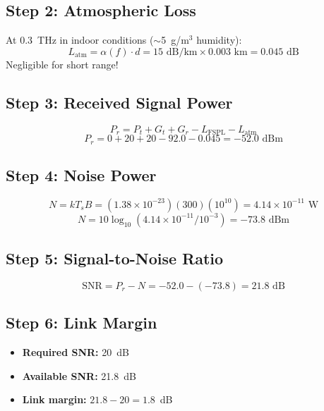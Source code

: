 \subsection*{Step 2: Atmospheric Loss}

At 0.3~THz in indoor conditions ($\sim$5~g/m$^3$ humidity):
\begin{equation}
L_{\text{atm}} = \alpha(f) \cdot d = 15 \text{ dB/km} \times 0.003 \text{ km} = 0.045 \text{ dB}
\end{equation}
Negligible for short range!

\subsection*{Step 3: Received Signal Power}

\begin{equation}
P_r = P_t + G_t + G_r - L_{\text{FSPL}} - L_{\text{atm}}
\end{equation}
\begin{equation}
P_r = 0 + 20 + 20 - 92.0 - 0.045 = -52.0 \text{ dBm}
\end{equation}

\subsection*{Step 4: Noise Power}

\begin{equation}
N = kT_sB = (1.38 \times 10^{-23})(300)(10^{10}) = 4.14 \times 10^{-11} \text{ W}
\end{equation}
\begin{equation}
N = 10\log_{10}(4.14 \times 10^{-11} / 10^{-3}) = -73.8 \text{ dBm}
\end{equation}

\subsection*{Step 5: Signal-to-Noise Ratio}

\begin{equation}
\text{SNR} = P_r - N = -52.0 - (-73.8) = 21.8 \text{ dB}
\end{equation}

\subsection*{Step 6: Link Margin}

\begin{itemize}
\item \textbf{Required SNR:} 20~dB
\item \textbf{Available SNR:} 21.8~dB
\item \textbf{Link margin:} $21.8 - 20 = 1.8$~dB
\end{itemize}

